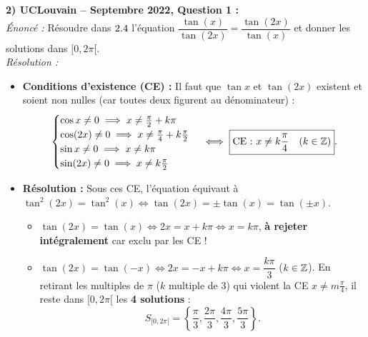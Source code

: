 \begin{exemple}
\medskip
\textbf{2) UCLouvain -- Septembre 2022, Question 1 :}\\
\emph{Énoncé :} Résoudre dans $2.4$ l'équation $\dfrac{\tan(x)}{\tan(2x)} = \dfrac{\tan(2x)}{\tan(x)}$ et donner les solutions dans $[0, 2\pi[$.\\
\emph{Résolution :}
\begin{itemize}
    \item \textbf{Conditions d'existence (CE) :} Il faut que $\tan x$ et $\tan(2x)$ existent et soient non nulles (car toutes deux figurent au dénominateur) :
    \[
        \begin{cases}
            \cos x \neq 0 \implies x \neq \frac{\pi}{2} + k\pi \\
            \cos(2x) \neq 0 \implies x \neq \frac{\pi}{4} + k\frac{\pi}{2} \\
            \sin x \neq 0 \implies x \neq k\pi \\
            \sin(2x) \neq 0 \implies x \neq k\frac{\pi}{2}
        \end{cases}
        \iff \boxed{\text{CE : } x \neq k\frac{\pi}{4} \quad (k \in \mathbb{Z})}.
    \]
    \item \textbf{Résolution :} Sous ces CE, l'équation équivaut à $\tan^2(2x) = \tan^2(x) \iff \tan(2x) = \pm\tan(x) = \tan(\pm x)$.
    \begin{itemize}
        \item $\tan(2x) = \tan(x) \iff 2x = x + k\pi \iff x = k\pi$, \textbf{à rejeter intégralement} car exclu par les CE !
        \item $\tan(2x) = \tan(-x) \iff 2x = -x + k\pi \iff x = \dfrac{k\pi}{3}$ ($k \in \mathbb{Z}$). En retirant les multiples de $\pi$ ($k$ multiple de $3$) qui violent la CE $x \neq m\frac{\pi}{4}$, il reste dans $[0, 2\pi[$ les \textbf{4 solutions} :
        \[
            \boxed{S_{[0, 2\pi[} = \left\{\frac{\pi}{3}, \frac{2\pi}{3}, \frac{4\pi}{3}, \frac{5\pi}{3}\right\}}.
        \]
    \end{itemize}
\end{itemize}


\end{exemple}
